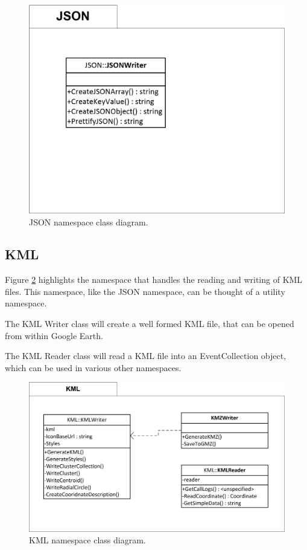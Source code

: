 \begin{figure}[H]
  \centering
    \includegraphics[scale=0.9]{chapter7/class_diagrams/json_namespace.png}
    \caption[JSON namespace class diagram]
            {JSON namespace class diagram.}
    \label{fig:NSJSON}
\end{figure}



\subsection{KML}
Figure \ref{fig:NSKML} highlights the namespace that handles the reading and 
writing of KML files. This namespace, like the JSON namespace, can be thought 
of a utility namespace.

The KML Writer class will create a well formed KML file, that can be opened 
from within Google Earth. 

The KML Reader class will read a KML file into an EventCollection object, which 
can be used in various other namespaces.

\begin{figure}[H]
  \centering
    \includegraphics[scale=0.9]{chapter7/class_diagrams/kml_namespace.png}
    \caption[KML namespace class diagram]
            {KML namespace class diagram.}
    \label{fig:NSKML}
\end{figure}


